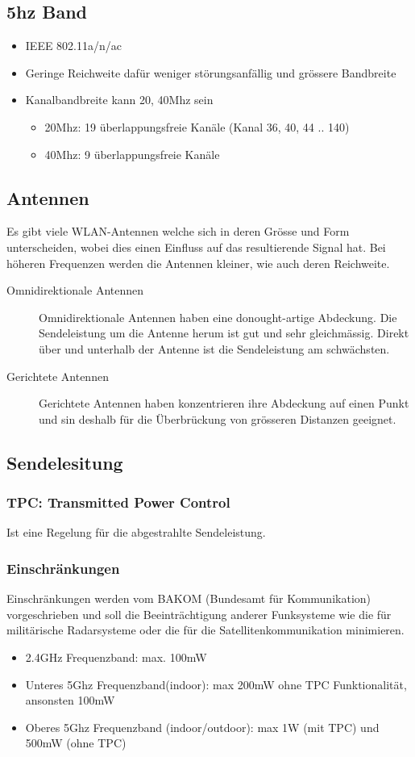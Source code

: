 \subsection{5hz Band}
\begin{itemize}
	\item IEEE 802.11a/n/ac
	\item Geringe Reichweite dafür weniger störungsanfällig und grössere Bandbreite
	\item Kanalbandbreite kann 20, 40Mhz sein
	\begin{itemize}
		\item 20Mhz: 19 überlappungsfreie Kanäle (Kanal 36, 40, 44 .. 140)
		\item 40Mhz: 9 überlappungsfreie Kanäle
	\end{itemize}
\end{itemize}

\subsection{Antennen}
Es gibt viele WLAN-Antennen welche sich in deren Grösse und Form unterscheiden,
wobei dies einen Einfluss auf das resultierende Signal hat. Bei höheren Frequenzen werden
die Antennen kleiner, wie auch deren Reichweite.

\begin{description}
	\item[Omnidirektionale Antennen] Omnidirektionale Antennen haben eine donought-artige Abdeckung. Die Sendeleistung um die Antenne herum ist gut und sehr gleichmässig. Direkt über und unterhalb der Antenne ist die Sendeleistung am schwächsten. 
	\item[Gerichtete Antennen] Gerichtete Antennen haben konzentrieren ihre Abdeckung auf einen Punkt und sin deshalb für die Überbrückung von grösseren Distanzen geeignet.
\end{description}
 
\subsection{Sendelesitung}
\subsubsection{TPC: Transmitted Power Control}
Ist eine Regelung für die abgestrahlte Sendeleistung.

\subsubsection{Einschränkungen}
Einschränkungen werden vom BAKOM (Bundesamt für Kommunikation) vorgeschrieben und soll die Beeinträchtigung anderer Funksysteme wie die für militärische Radarsysteme oder die für die Satellitenkommunikation minimieren.
\begin{itemize}
	\item 2.4GHz Frequenzband: max. 100mW
	\item Unteres 5Ghz Frequenzband(indoor): max 200mW ohne TPC Funktionalität, ansonsten 100mW
	\item Oberes 5Ghz Frequenzband (indoor/outdoor):  max 1W (mit TPC) und 500mW (ohne TPC)
\end{itemize}

